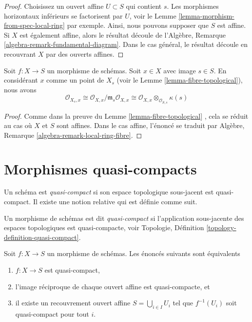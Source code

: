 \begin{proof}
Choisissez un ouvert affine  $U \subset S$  qui contient  $s$. Les morphismes
horizontaux inférieurs se factorisent par  $U$, voir le Lemme  \ref{lemma-morphism-from-spec-local-ring} 
par exemple. Ainsi, nous pouvons supposer que  $S$  est affine. Si
 $X$  est également affine, alors le résultat découle de l'Algèbre,
Remarque  \ref{algebra-remark-fundamental-diagram}. Dans le cas général, le résultat découle en recouvrant
 $X$  par des ouverts affines.
\end{proof}

\begin{lemma}
\label{lemma-local-ring-fibre}
Soit  $f : X \to S$  un morphisme de schémas. Soit  $x \in X$  avec image
 $s \in S$. En considérant  $x$  comme un point de  $X_s$  (voir le
Lemme  \ref{lemma-fibre-topological}), nous avons
$$
\mathcal{O}_{X_s, x} \cong
\mathcal{O}_{X, x}/\mathfrak m_s\mathcal{O}_{X, x} \cong
\mathcal{O}_{X, x} \otimes_{\mathcal{O}_{S, s}} \kappa(s)
$$
\end{lemma}

\begin{proof}
Comme dans la preuve du Lemme  \ref{lemma-fibre-topological} , cela se réduit au cas où  $X$ 
et  $S$  sont affines. Dans le cas affine, l'énoncé se traduit par Algèbre,
Remarque  \ref{algebra-remark-local-ring-fibre}.
\end{proof}







\section{Morphismes quasi-compacts}
\label{section-quasi-compact}

\noindent
Un schéma est  {\it  quasi-compact}  si son espace
topologique sous-jacent est quasi-compact. Il existe une notion relative qui est
définie comme suit.

\begin{definition}
\label{definition-quasi-compact}
Un morphisme de schémas est dit  {\it  quasi-compact} 
si l'application sous-jacente des espaces topologiques est quasi-compacte, voir
Topologie, Définition  \ref{topology-definition-quasi-compact}.
\end{definition}

\begin{lemma}
\label{lemma-quasi-compact-affine}
Soit  $f : X \to S$  un morphisme de schémas. Les énoncés suivants sont équivalents
\begin{enumerate}
\item $f : X \to S$  est quasi-compact,
\item l'image réciproque de chaque ouvert affine est quasi-compacte, et
\item il existe un recouvrement ouvert affine  $S = \bigcup_{i \in I} U_i$  tel que  $f^{-1}(U_i)$  soit
quasi-compact pour tout  $i$.
\end{enumerate}
\end{lemma}

